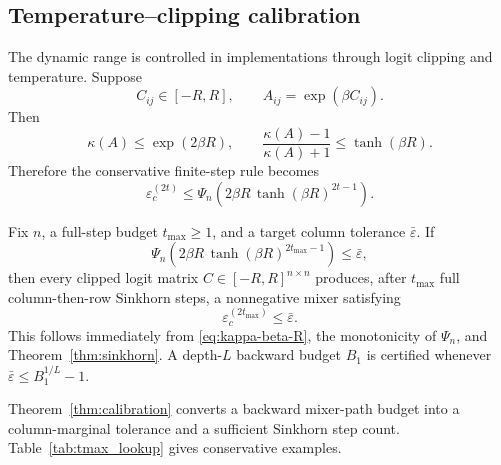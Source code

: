\documentclass[10pt]{article}
\numberwithin{equation}{section}
\theoremstyle{plain}
\theoremstyle{definition}
\theoremstyle{remark}
\begin{document}
\subsection{Temperature--clipping calibration}\label{subsec:temperature_clipping}
The dynamic range is controlled in implementations through logit clipping and temperature. Suppose
\begin{equation}
        C_{ij}\in[-R,R],
        \qquad
        A_{ij}=\exp(\beta C_{ij}).
\end{equation}
Then
\begin{equation}\label{eq:kappa-beta-R}
        \kappa(A)\le \exp(2\beta R),
        \qquad
        \frac{\kappa(A)-1}{\kappa(A)+1}\le \tanh(\beta R).
\end{equation}
Therefore the conservative finite-step rule becomes
\begin{equation}\label{eq:beta-R-cert}
        \varepsilon_c^{(2t)}
        \le
        \Psi_n\!\left(2\beta R\,\tanh(\beta R)^{2t-1}\right).
\end{equation}

Fix $n$, a full-step budget $t_{\max}\ge1$, and a target column tolerance $\bar\varepsilon$. If
\begin{equation}\label{eq:temperature-clipping-condition}
        \Psi_n\!\left(2\beta R\,\tanh(\beta R)^{2t_{\max}-1}\right)
        \le
        \bar\varepsilon,
\end{equation}
then every clipped logit matrix $C\in[-R,R]^{n\times n}$ produces, after $t_{\max}$ full column-then-row Sinkhorn steps, a nonnegative mixer satisfying
\[
        \varepsilon_c^{(2t_{\max})}\le \bar\varepsilon.
\]
This follows immediately from \eqref{eq:kappa-beta-R}, the monotonicity of $\Psi_n$, and Theorem~\ref{thm:sinkhorn}. A depth-$L$ backward budget $B_1$ is certified whenever $\bar\varepsilon\le B_1^{1/L}-1$.



Theorem~\ref{thm:calibration} converts a backward mixer-path budget into a
column-marginal tolerance and a sufficient Sinkhorn step count. Table~\ref{tab:tmax_lookup}
gives conservative examples.
\end{document}
